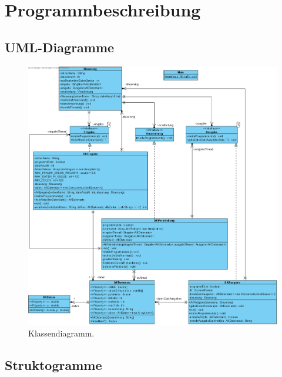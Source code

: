 \chapter{Programmbeschreibung}\label{ch:programmbeschreibung}

\section{UML-Diagramme}\label{sec:uml}

\begin{figure}[htb]
    \centering
    \includegraphics[width=\linewidth]{images/ClassDiagram1}
    \caption{
        Klassendiagramm.
    }
    \label{fig:klassen-dia}
\end{figure}

\section{Struktogramme}\label{sec:strukto}

